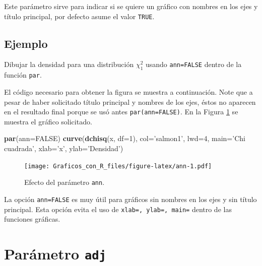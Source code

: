 \documentclass[10pt,]{krantz}
\makeatletter
\newenvironment{Shaded}{\begin{snugshade}}{\end{snugshade}}
\newcommand{\KeywordTok}[1]{\textcolor[rgb]{0.13,0.29,0.53}{\textbf{{#1}}}}
\newcommand{\DataTypeTok}[1]{\textcolor[rgb]{0.13,0.29,0.53}{{#1}}}
\newcommand{\DecValTok}[1]{\textcolor[rgb]{0.00,0.00,0.81}{{#1}}}
\newcommand{\StringTok}[1]{\textcolor[rgb]{0.31,0.60,0.02}{{#1}}}
\newcommand{\OtherTok}[1]{\textcolor[rgb]{0.56,0.35,0.01}{{#1}}}
\newcommand{\NormalTok}[1]{{#1}}
\newenvironment{kframe}{%
\medskip{}
\setlength{\fboxsep}{.8em}
 \def\at@end@of@kframe{}%
 \ifinner\ifhmode%
  \def\at@end@of@kframe{\end{minipage}}%
  \begin{minipage}{\columnwidth}%
 \fi\fi%
 \def\FrameCommand##1{\hskip\@totalleftmargin \hskip-\fboxsep
 \colorbox{shadecolor}{##1}\hskip-\fboxsep
     \hskip-\linewidth \hskip-\@totalleftmargin \hskip\columnwidth}%
 \MakeFramed {\advance\hsize-\width
   \@totalleftmargin\z@ \linewidth\hsize
   \@setminipage}}%
 {\par\unskip\endMakeFramed%
 \at@end@of@kframe}
\renewenvironment{Shaded}{\begin{kframe}}{\end{kframe}}
\let\BeginKnitrBlock\begin \let\EndKnitrBlock\end
\makeatother
\begin{document}
Este parámetro sirve para indicar si se quiere un gráfico con nombres en
los ejes y título principal, por defecto asume el valor \texttt{TRUE}.

\subsection*{Ejemplo}\label{ejemplo-22}


Dibujar la densidad para una distribución \(\chi^2_1\) usando
\texttt{ann=FALSE} dentro de la función \texttt{par}.

El código necesario para obtener la figura se muestra a continuación.
Note que a pesar de haber solicitado título principal y nombres de los
ejes, éstos no aparecen en el resultado final porque se usó antes
\texttt{par(ann=FALSE)}. En la Figura \ref{fig:ann} se muestra el
gráfico solicitado.

\begin{Shaded}
\begin{Highlighting}[]
\KeywordTok{par}\NormalTok{(}\DataTypeTok{ann=}\OtherTok{FALSE}\NormalTok{)}
\KeywordTok{curve}\NormalTok{(}\KeywordTok{dchisq}\NormalTok{(x, }\DataTypeTok{df=}\DecValTok{1}\NormalTok{), }\DataTypeTok{col=}\StringTok{'salmon1'}\NormalTok{, }\DataTypeTok{lwd=}\DecValTok{4}\NormalTok{,}
      \DataTypeTok{main=}\StringTok{'Chi cuadrada'}\NormalTok{,}
      \DataTypeTok{xlab=}\StringTok{'x'}\NormalTok{, }\DataTypeTok{ylab=}\StringTok{'Densidad'}\NormalTok{)}
\end{Highlighting}
\end{Shaded}

\begin{figure}[htbp]
\centering
\texttt{[image: Graficos\_con\_R\_files/figure-latex/ann-1.pdf]}
\caption{\label{fig:ann}Efecto del parámetro \texttt{ann}.}
\end{figure}

\BeginKnitrBlock{rmdnote}
La opción \texttt{ann=FALSE} es muy útil para gráficos sin nombres en
los ejes y sin título principal. Esta opción evita el uso de
\texttt{xlab=\textquotesingle{}\textquotesingle{},\ ylab=\textquotesingle{}\textquotesingle{},\ main=\textquotesingle{}\textquotesingle{}}
dentro de las funciones gráficas.
\EndKnitrBlock{rmdnote}

\section{\texorpdfstring{Parámetro \texttt{adj}
}{Parámetro adj  }}\label{parametro-adj}
\end{document}
